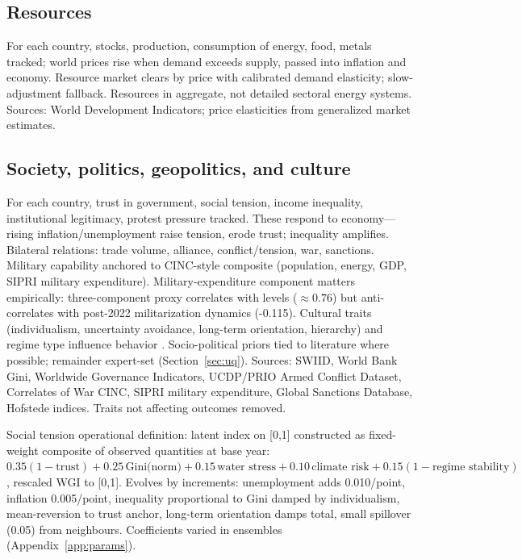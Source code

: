 \documentclass[a4paper,fleqn]{cas-sc}
\begin{document}
\subsection{Resources}

For each country, stocks, production, consumption of energy, food, metals tracked; world prices rise when demand exceeds supply, passed into inflation and economy. Resource market clears by price with calibrated demand elasticity; slow-adjustment fallback. Resources in aggregate, not detailed sectoral energy systems. Sources: World Development Indicators; price elasticities from generalized market estimates.

\subsection{Society, politics, geopolitics, and culture}

For each country, trust in government, social tension, income inequality, institutional legitimacy, protest pressure tracked. These respond to economy---rising inflation/unemployment raise tension, erode trust; inequality amplifies. Bilateral relations: trade volume, alliance, conflict/tension, war, sanctions. Military capability anchored to CINC-style composite (population, energy, GDP, SIPRI military expenditure). Military-expenditure component matters empirically: three-component proxy correlates with levels ($\approx 0.76$) but anti-correlates with post-2022 militarization dynamics (-0.115). Cultural traits (individualism, uncertainty avoidance, long-term orientation, hierarchy) and regime type influence behavior \citep{hofstede2010}. Socio-political priors tied to literature where possible; remainder expert-set (Section~\ref{sec:uq}). Sources: SWIID, World Bank Gini, Worldwide Governance Indicators, UCDP/PRIO Armed Conflict Dataset, Correlates of War CINC, SIPRI military expenditure, Global Sanctions Database, Hofstede indices. Traits not affecting outcomes removed.

Social tension operational definition: latent index on [0,1] constructed as fixed-weight composite of observed quantities at base year: $0.35(1-\text{trust}) + 0.25\,\text{Gini(norm)} + 0.15\,\text{water stress} + 0.10\,\text{climate risk} + 0.15(1-\text{regime stability})$, rescaled WGI to [0,1]. Evolves by increments: unemployment adds 0.010/point, inflation 0.005/point, inequality proportional to Gini damped by individualism, mean-reversion to trust anchor, long-term orientation damps total, small spillover (0.05) from neighbours. Coefficients varied in ensembles (Appendix~\ref{app:params}).
\end{document}
